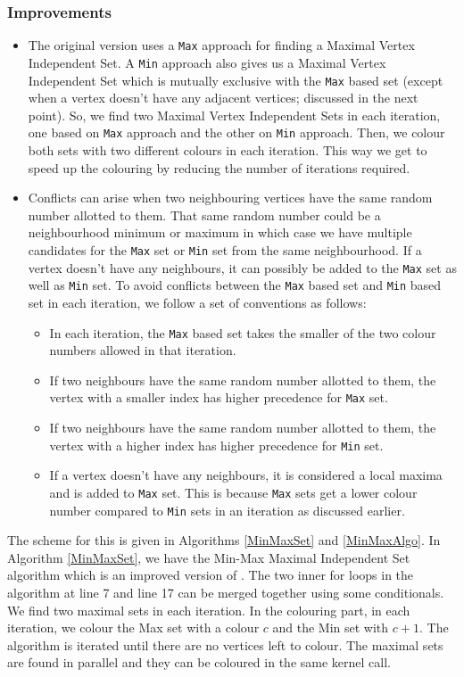 \documentclass[MTech]{iitmdiss}
\begin{document}
\subsubsection{Improvements}
\begin{itemize}
\item The original version uses a \verb+Max+ approach for finding a Maximal Vertex Independent Set. A \verb+Min+ approach also gives us a Maximal Vertex Independent Set which is mutually exclusive with the \verb+Max+ based set (except when a vertex doesn't have any adjacent vertices; discussed in the next point). So, we find two Maximal Vertex Independent Sets in each iteration, one based on \verb+Max+ approach and the other on \verb+Min+ approach. Then, we colour both sets with two different colours in each iteration. This way we get to speed up the colouring by reducing the number of iterations required. 
\item Conflicts can arise when two neighbouring vertices have the same random number allotted to them. That same random number could be a neighbourhood minimum or maximum in which case we have multiple candidates for the \verb+Max+ set or \verb+Min+ set from the same neighbourhood. If a vertex doesn't have any neighbours, it can possibly be added to the  \verb+Max+ set as well as \verb+Min+ set. To avoid conflicts between the \verb+Max+ based set and \verb+Min+ based set in each iteration, we follow a set of conventions as follows:
\begin{itemize}
\item In each iteration, the \verb+Max+ based set takes the smaller of the two colour numbers allowed in that iteration.
\item If two neighbours have the same random number allotted to them, the vertex with a smaller index has higher precedence for \verb+Max+ set.
\item If two neighbours have the same random number allotted to them, the vertex with a higher index has higher precedence for \verb+Min+ set.
\item If a vertex doesn't have any neighbours, it is considered a local maxima and is added to \verb+Max+ set. This is because \verb+Max+ sets get a lower colour number compared to \verb+Min+ sets in an iteration as discussed earlier. 
\end{itemize}
\end{itemize}

The scheme for this is given in Algorithms \ref{MinMaxSet} and \ref{MinMaxAlgo}. In Algorithm \ref{MinMaxSet}, we have the Min-Max Maximal Independent Set algorithm which is an improved version of \citet{Luby:1985:SPA:22145.22146}. The two inner for loops in the algorithm at line 7 and line 17 can be merged together using some conditionals. We find two maximal sets in each iteration. In the colouring part, in each iteration, we colour the Max set with a colour $c$ and the Min set with $c+1$. The algorithm is iterated until there are no vertices left to colour. The maximal sets are found in parallel and they can be coloured in the same kernel call.  
\end{document}
